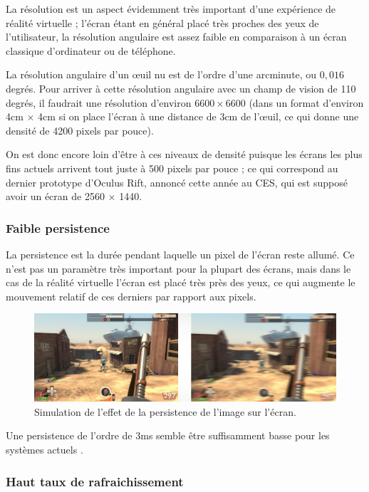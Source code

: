 \documentclass[a4,12pt]{scrartcl}
\begin{document}
La résolution est un aspect évidemment très important d'une expérience de réalité virtuelle ; l'écran étant en général placé très proches des yeux de l'utilisateur, la résolution angulaire est assez faible en comparaison à un écran classique d'ordinateur ou de téléphone.

La résolution angulaire d'un \oe{}uil nu est de l'ordre d'une arcminute, ou $0,016$ degrés. Pour arriver à cette résolution angulaire avec un champ de vision de 110 degrés, il faudrait une résolution d'environ $6600 \times 6600$ (dans un format d'environ 4cm $\times$ 4cm si on place l'écran à une distance de 3cm de l'\oe{}uil, ce qui donne une densité de 4200 pixels par pouce).

On est donc encore loin d'être à ces niveaux de densité puisque les écrans les plus fins actuels arrivent tout juste à 500 pixels par pouce ; ce qui correspond au dernier prototype d'Oculus Rift, annoncé cette année au CES, qui est supposé avoir un écran de 2560 $\times$ 1440.

\subsubsection{Faible persistence}

La persistence est la durée pendant laquelle un pixel de l'écran reste allumé. Ce n'est pas un paramètre très important pour la plupart des écrans, mais dans le cas de la réalité virtuelle l'écran est placé très près des yeux, ce qui augmente le mouvement relatif de ces derniers par rapport aux pixels.

\begin{figure}[H]
	\centering
	\includegraphics[width=\linewidth]{persistence}
	\caption{Simulation de l'effet de la persistence de l'image sur l'écran.}
\end{figure}

Une persistence de l'ordre de 3ms semble être suffisamment basse pour les systèmes actuels \cite{Abrash14}.

\subsubsection{Haut taux de rafraichissement}
\end{document}
